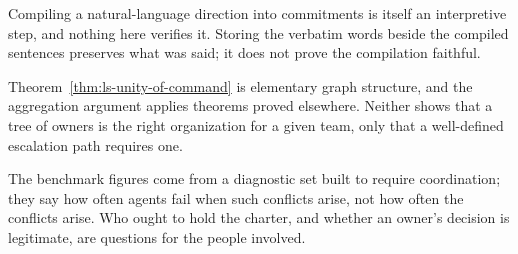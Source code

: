 \begin{pdboundary}
\setlength{\parskip}{4pt plus 1pt}
Compiling a natural-language direction into commitments is itself an
interpretive step, and nothing here verifies it. Storing the verbatim words
beside the compiled sentences preserves what was said; it does not prove the
compilation faithful.

Theorem~\ref{thm:ls-unity-of-command} is elementary graph structure, and the
aggregation argument applies theorems proved elsewhere. Neither shows that a
tree of owners is the right organization for a given team, only that a
well-defined escalation path requires one.

The benchmark figures come from a diagnostic set built to require
coordination; they say how often agents fail when such conflicts arise, not how
often the conflicts arise. Who ought to hold the charter, and whether an
owner's decision is legitimate, are questions for the people involved.
\end{pdboundary}

\pdexercisepointer{\ref{ex:ls-many-authors-tree}}{\ref{ex:ls-many-authors-pause}}{\pageref{ex:ls-many-authors-tree}}
